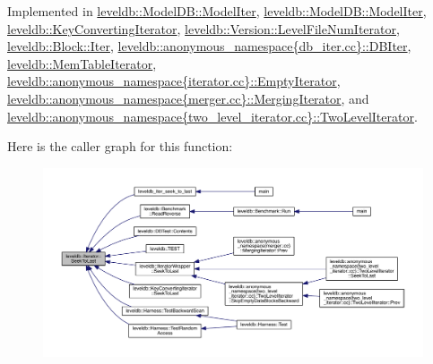 Implemented in \hyperlink{classleveldb_1_1_model_d_b_1_1_model_iter_a73f54e91a379f3584aaa1ad99f435c5f}{leveldb\+::\+Model\+D\+B\+::\+Model\+Iter}, \hyperlink{classleveldb_1_1_model_d_b_1_1_model_iter_a73f54e91a379f3584aaa1ad99f435c5f}{leveldb\+::\+Model\+D\+B\+::\+Model\+Iter}, \hyperlink{classleveldb_1_1_key_converting_iterator_a9db639879c442a67234fc345887b19fc}{leveldb\+::\+Key\+Converting\+Iterator}, \hyperlink{classleveldb_1_1_version_1_1_level_file_num_iterator_ac7fafc33c049d1e33fdf9b5ae99f73d8}{leveldb\+::\+Version\+::\+Level\+File\+Num\+Iterator}, \hyperlink{classleveldb_1_1_block_1_1_iter_a3007d98d17a03138c629fc2b2eb56204}{leveldb\+::\+Block\+::\+Iter}, \hyperlink{classleveldb_1_1anonymous__namespace_02db__iter_8cc_03_1_1_d_b_iter_a9357ea6d3c8d3c12b11306a154fbf1bb}{leveldb\+::anonymous\+\_\+namespace\{db\+\_\+iter.\+cc\}\+::\+D\+B\+Iter}, \hyperlink{classleveldb_1_1_mem_table_iterator_aaed044dc887a51c924086f2a2844a5f0}{leveldb\+::\+Mem\+Table\+Iterator}, \hyperlink{classleveldb_1_1anonymous__namespace_02iterator_8cc_03_1_1_empty_iterator_a9ba5b11f3730923474f6599987cf5829}{leveldb\+::anonymous\+\_\+namespace\{iterator.\+cc\}\+::\+Empty\+Iterator}, \hyperlink{classleveldb_1_1anonymous__namespace_02merger_8cc_03_1_1_merging_iterator_ac033fb9c53330c02460b7552588fd530}{leveldb\+::anonymous\+\_\+namespace\{merger.\+cc\}\+::\+Merging\+Iterator}, and \hyperlink{classleveldb_1_1anonymous__namespace_02two__level__iterator_8cc_03_1_1_two_level_iterator_a6290531510ed53c27051fbbe5fd9db67}{leveldb\+::anonymous\+\_\+namespace\{two\+\_\+level\+\_\+iterator.\+cc\}\+::\+Two\+Level\+Iterator}.



Here is the caller graph for this function\+:
\nopagebreak
\begin{figure}[H]
\begin{center}
\leavevmode
\includegraphics[width=350pt]{classleveldb_1_1_iterator_a8ad637f0a759e6d94cca6c5b4db440d3_icgraph}
\end{center}
\end{figure}


